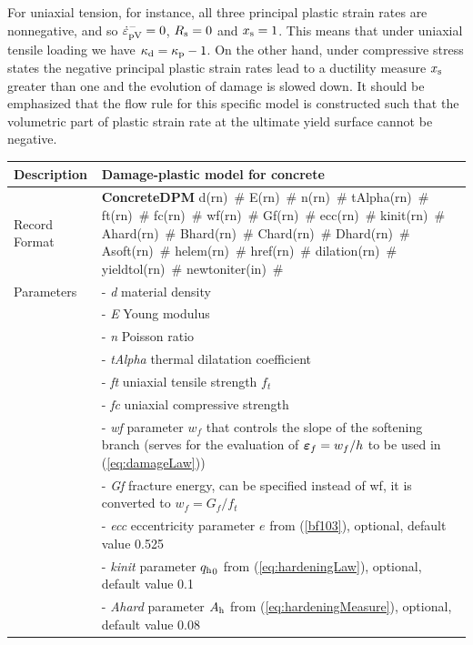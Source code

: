 \documentclass[a4paper]{article}
\newcommand{\mbf}[1]{\mbox{\boldmath$#1$}}
\newcommand{\descitem}[1]{{\noindent \bf #1}}
\newcommand{\elemparam}[2]{{{#1\tiny (#2)}~\#}}
\newcommand{\param}[1]{{\it #1}}
\newcommand{\eps} {\mbf{\varepsilon}}
\newenvironment{mmt}{\begin{tabular}{|l|p{9cm}|}}{\end{tabular}\\}
\newenvironment{mmt}{\begin{tabular}{|l|l|}}{\end{tabular}\\}
\begin{document}
For uniaxial tension, for instance, all three principal plastic strain rates are nonnegative, and so $\dot{\varepsilon}_{\rm pV}^{-} =0$, $R_{\rm s}=0$ and $x_{\rm s}=1$. This means that under uniaxial tensile loading we have $\kappa_{\rm d}=\kappa_{\rm p}-1$. On the other hand, under compressive stress states the negative principal plastic strain rates lead to a ductility measure $x_{\rm s}$ greater than one and the evolution of damage is slowed down. It should be emphasized that the flow rule for this specific model is constructed such that the volumetric part of plastic strain rate at the ultimate yield surface cannot be negative.

\begin{table}[!htb]
\begin{mmt}
\hline
Description & Damage-plastic model for concrete\\
\hline
Record Format & \descitem{ConcreteDPM}  \elemparam{d}{rn}
\elemparam{E}{rn} \elemparam{n}{rn} \elemparam{tAlpha}{rn}
 \elemparam{ft}{rn} \elemparam{fc}{rn} \elemparam{wf}{rn} \elemparam{Gf}{rn} \elemparam{ecc}{rn}
 \elemparam{kinit}{rn} \elemparam{Ahard}{rn} \elemparam{Bhard}{rn} \elemparam{Chard}{rn} \elemparam{Dhard}{rn} \elemparam{Asoft}{rn} \elemparam{helem}{rn} \elemparam{href}{rn} \elemparam{dilation}{rn} \elemparam{yieldtol}{rn} \elemparam{newtoniter}{in} \\
Parameters &- \param{d} material density\\
&- \param{E} Young modulus\\
&- \param{n} Poisson ratio\\
&- \param{tAlpha} thermal dilatation coefficient\\
&- \param{ft} uniaxial tensile strength $f_t$\\
&- \param{fc} uniaxial compressive strength\\
&- \param{wf} parameter $w_f$ that controls the slope of the softening branch (serves for the evaluation of $\eps_f=w_f/h$ to be used in (\ref{eq:damageLaw}))\\
&- \param{Gf} fracture energy, can be specified instead of wf, it is converted to $w_f=G_f/f_t$ \\
&- \param{ecc} eccentricity parameter $e$ from (\ref{bf103}), optional, default value 0.525\\
&- \param{kinit} parameter ${q_{\rm h}}_0$ from (\ref{eq:hardeningLaw}), optional, default value 0.1\\
&- \param{Ahard} parameter $A_{\rm h}$ from (\ref{eq:hardeningMeasure}), optional, default value 0.08\\

\end{mmt}
\end{table}
\end{document}
